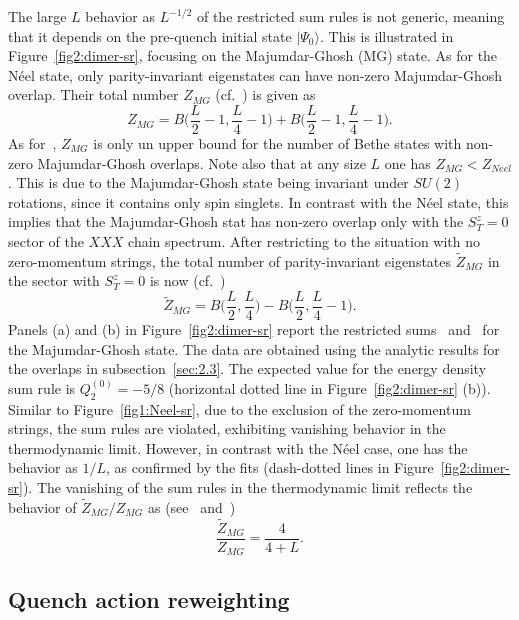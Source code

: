 \documentclass[11pt]{iopart}
\begin{document}
The large $L$ behavior as $L^{-1/2}$  of the restricted sum 
rules is not generic, meaning that it depends on the pre-quench initial state $|\Psi_0
\rangle$. This is illustrated in Figure~\ref{fig2:dimer-sr}, focusing on the 
Majumdar-Ghosh (MG) state. As for the N\'eel state, only parity-invariant eigenstates 
can have non-zero Majumdar-Ghosh overlap. Their total number $Z_{MG}$ (cf.~) 
is given as 
%
\begin{equation}
\label{mg1}
Z_{MG}=B\Big(\frac{L}{2}-1,\frac{L}{4}-1\Big)+B\Big(\frac{L}{2}-1,
\frac{L}{4}-1\Big). 
\end{equation}
%
As for~, $Z_{MG}$ is only un upper bound for the number of Bethe states with 
non-zero Majumdar-Ghosh overlaps. Note also that at any size $L$ one has $Z_{MG}<Z_{Neel}$. 
This is due to the Majumdar-Ghosh state being invariant under $SU(2)$ rotations, since it 
contains only spin singlets. In contrast with the N\'eel state, this implies that the 
Majumdar-Ghosh stat has non-zero overlap only with the $S^z_T=0$ sector of the $XXX$ chain 
spectrum. After restricting to the situation with no zero-momentum strings, the total number 
of parity-invariant eigenstates $\widetilde Z_{MG}$ in the sector with $S_T^z=0$ is now 
(cf.~)
%
\begin{equation}
\label{mg2}
\widetilde Z_{MG}=B\Big(\frac{L}{2},\frac{L}{4}\Big)-B\Big(\frac{L}{2},
\frac{L}{4}-1\Big). 
\end{equation}
%
Panels (a) and (b) in Figure~\ref{fig2:dimer-sr} report the restricted sums~ 
and~ for the Majumdar-Ghosh state. The data are obtained using the 
analytic results for the overlaps in subsection~\ref{sec:2.3}. The expected value for 
the energy density sum rule is $Q_2^{(0)}=-5/8$ (horizontal dotted line in 
Figure~\ref{fig2:dimer-sr} (b)). Similar to Figure~\ref{fig1:Neel-sr}, due to the exclusion 
of the zero-momentum strings, the sum rules are violated, exhibiting vanishing behavior in 
the thermodynamic limit. However, in contrast with the N\'eel case, one has the behavior 
as $1/L$, as confirmed by the fits (dash-dotted lines in Figure~\ref{fig2:dimer-sr}). 
The vanishing of the sum rules in the thermodynamic limit 
reflects the behavior of $\widetilde Z_{MG}/Z_{MG}$ as (see~ and~)
%
\begin{equation}
\frac{\widetilde Z_{MG}}{Z_{MG}}=\frac{4}{4+L}. 
\end{equation}
%

\subsection{Quench action reweighting}
\end{document}
